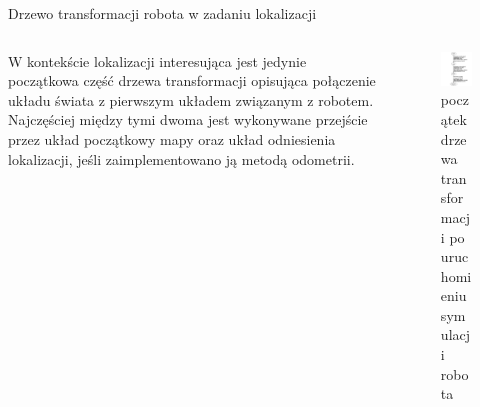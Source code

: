 \begin{frame}
{Drzewo transformacji robota w zadaniu lokalizacji}
	\begin{columns}
		\begin{column}{0.5\textwidth}
				W kontekście lokalizacji interesująca jest jedynie początkowa część drzewa transformacji opisująca połączenie układu świata z pierwszym układem związanym z robotem.
	Najczęściej między tymi dwoma jest wykonywane przejście przez układ początkowy mapy oraz układ odniesienia lokalizacji, jeśli zaimplementowano ją metodą odometrii.
		\end{column}
		\begin{column}{0.5\textwidth}  %
			\begin{figure}
				\begin{center}
					\includegraphics[height=0.6\textheight]{img/velma_tf.png} 
					\caption{początek drzewa transformacji po uruchomieniu symulacji robota}
				\end{center}
			\end{figure}
		\end{column}
	\end{columns}
\end{frame}

